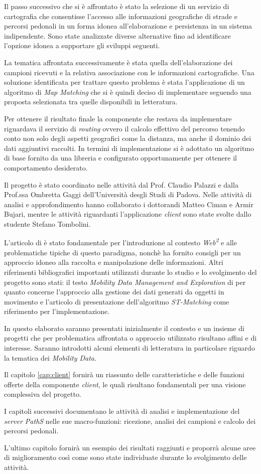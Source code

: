 Il passo successivo che si è affrontato è stato la selezione di un servizio di cartografia che consentisse l'accesso alle informazioni geografiche di strade e percorsi pedonali in un forma idonea all'elaborazione e persistenza in un sistema indipendente. Sono state analizzate diverse alternative fino ad identificare l'opzione idonea a supportare gli sviluppi seguenti.

La tematica affrontata successivamente è stata quella dell'elaborazione dei campioni ricevuti e la relativa associazione con le informazioni cartografiche. Una soluzione identificata per trattare questo problema è stata l'applicazione di un algoritmo di \emph{Map Matching} che si è quindi deciso di implementare seguendo una proposta selezionata tra quelle disponibili in letteratura.

Per ottenere il risultato finale la componente che restava da implementare riguardava il servizio di \emph{routing} ovvero il calcolo effettivo del percorso tenendo conto non solo degli aspetti geografici come la distanza, ma anche il dominio dei dati aggiuntivi raccolti. In termini di implementazione si è adottato un algoritmo di base fornito da una libreria e configurato opportunamente per ottenere il comportamento desiderato.

Il progetto è stato coordinato nelle attività dal Prof. Claudio Palazzi e dalla Prof.ssa Ombretta Gaggi dell'Università desgli Studi di Padova. Nelle attività di analisi e approfondimento hanno collaborato i dottorandi Matteo Ciman e Armir Bujari, mentre le attività riguardanti l'applicazione \emph{client} sono state svolte dallo studente Stefano Tombolini.

L'articolo di \textcite{web2palazzi} è stato fondamentale per l'introduzione al contesto \emph{Web\textsuperscript{2}} e alle problematiche tipiche di questo paradigma, nonchè ha fornito consigli per un approccio idoneo alla raccolta e manipolazione delle informazioni.
Altri riferimenti bibliografici importanti utilizzati durante lo studio e lo svolgimento del progetto sono stati: il testo \textit{Mobility Data Management and Exploration} di \textcite{mdme} per quanto concerne l'approccio alla gestione dei dati generati da oggetti in movimento e l'articolo di presentazione dell'algoritmo \emph{ST-Matching} come riferimento per l'implementazione.

In questo elaborato saranno presentati inizialmente il contesto e un insieme di progetti che per problematica affrontata o approccio utilizzato risultano affini e di interesse. Saranno introdotti alcuni elementi di letteratura in particolare riguardo la tematica dei \emph{Mobility Data}.

Il capitolo \ref{cap:client} fornirà un riassunto delle caratteristiche e delle funzioni offerte della componente \emph{client}, le quali risultano fondamentali per una visione complessiva del progetto.

I capitoli successivi documentano le attività di analisi e implementazione del \emph{server PathS} nelle sue macro-funzioni: ricezione, analisi dei campioni e calcolo dei percorsi pedonali.

L'ultimo capitolo fornirà un esempio dei risultati raggiunti e proporrà alcune aree di miglioramento così come sono state individuate durante lo svolgimento delle attività.
